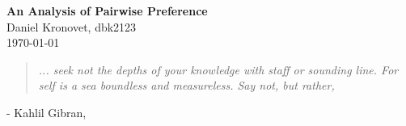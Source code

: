 \begin{center}
  \Large \textbf{An Analysis of Pairwise Preference} \\
  \vspace{0.15in}
  \normalsize Daniel Kronovet, dbk2123\\
  \today
\end{center}
  
\begin{center}  
\begin{quotation}
\textit{
	... seek not the depths of your knowledge with staff or sounding line.
	For self is a sea boundless and measureless.
	Say not,  but rather, 
	}
\end{quotation}
- Kahlil Gibran, \textit{} 
\end{center}